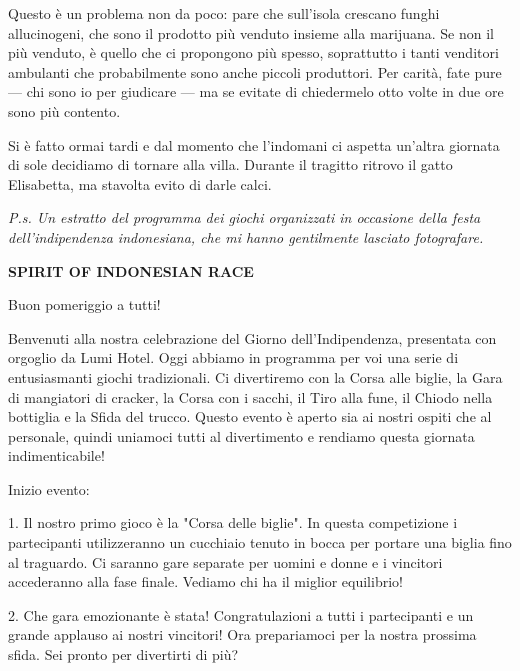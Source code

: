 Questo è un problema non da poco: pare che sull'isola crescano funghi allucinogeni, che sono il prodotto più venduto insieme alla marijuana. Se non il più venduto, è quello che ci propongono più spesso, soprattutto i tanti venditori ambulanti che probabilmente sono anche piccoli produttori. Per carità, fate pure — chi sono io per giudicare — ma se evitate di chiedermelo otto volte in due ore sono più contento.

Si è fatto ormai tardi e dal momento che l'indomani ci aspetta un'altra giornata di sole decidiamo di tornare alla villa. Durante il tragitto ritrovo il gatto Elisabetta, ma stavolta evito di darle calci.

\clearpage

\textit{P.s. Un estratto del programma dei giochi organizzati in occasione della festa dell'indipendenza indonesiana, che mi hanno gentilmente lasciato fotografare.}
\newline

\textbf{SPIRIT OF INDONESIAN RACE}
\newline

Buon pomeriggio a tutti! 
\newline

Benvenuti alla nostra celebrazione del Giorno dell'Indipendenza, presentata con orgoglio da Lumi Hotel. Oggi abbiamo in programma per voi una serie di entusiasmanti giochi tradizionali. Ci divertiremo con la Corsa alle biglie, la Gara di mangiatori di cracker, la Corsa con i sacchi, il Tiro alla fune, il Chiodo nella bottiglia e la Sfida del trucco. Questo evento è aperto sia ai nostri ospiti che al personale, quindi uniamoci tutti al divertimento e rendiamo questa giornata indimenticabile!
\newline

Inizio evento:
\newline

1. Il nostro primo gioco è la "Corsa delle biglie". In questa competizione i partecipanti utilizzeranno un cucchiaio tenuto in bocca per portare una biglia fino al traguardo. Ci saranno gare separate per uomini e donne e i vincitori accederanno alla fase finale. Vediamo chi ha il miglior equilibrio!
\newline

2. Che gara emozionante è stata! Congratulazioni a tutti i partecipanti e un grande applauso ai nostri vincitori! Ora prepariamoci per la nostra prossima sfida. Sei pronto per divertirti di più?
\newline

